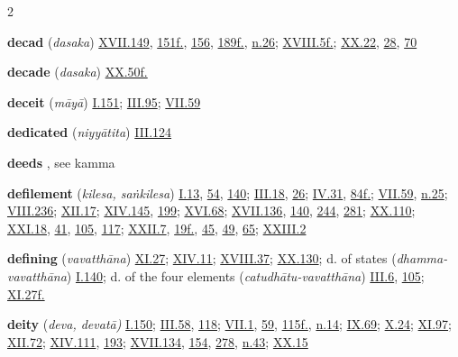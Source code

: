 \begin{multicols}{2}
\begin{vismHanging}
\par\textbf{decad} (\emph{dasaka}) \hyperlink{XVII.149}{XVII.149}{}, \hyperlink{XVII.151}{151f.}{}, \hyperlink{XVII.156}{156}{}, \hyperlink{XVII.189}{189f.}{}, \hyperlink{XVII.n26}{n.26}{}; \hyperlink{XVIII.5}{XVIII.5f.}{}; \hyperlink{XX.22}{XX.22}{}, \hyperlink{XX.28}{28}{}, \hyperlink{XX.70}{70}{}
\par\textbf{decade} (\emph{dasaka}) \hyperlink{XX.50}{XX.50f.}{}
\par\textbf{deceit} (\emph{māyā}) \hyperlink{I.151}{I.151}{}; \hyperlink{III.95}{III.95}{}; \hyperlink{VII.59}{VII.59}{}
\par\textbf{dedicated} (\emph{niyyātita}) \hyperlink{III.124}{III.124}{}
\par\textbf{deeds} , see kamma
\par\textbf{defilement} (\emph{kilesa, saṅkilesa}) \hyperlink{I.13}{I.13}{}, \hyperlink{I.54}{54}{}, \hyperlink{I.140}{140}{}; \hyperlink{III.18}{III.18}{}, \hyperlink{III.26}{26}{}; \hyperlink{IV.31}{IV.31}{}, \hyperlink{IV.84}{84f.}{}; \hyperlink{VII.59}{VII.59}{}, \hyperlink{VII.n25}{n.25}{}; \hyperlink{VIII.236}{VIII.236}{}; \hyperlink{XII.17}{XII.17}{}; \hyperlink{XIV.145}{XIV.145}{}, \hyperlink{XIV.199}{199}{}; \hyperlink{XVI.68}{XVI.68}{}; \hyperlink{XVII.136}{XVII.136}{}, \hyperlink{XVII.140}{140}{}, \hyperlink{XVII.244}{244}{}, \hyperlink{XVII.281}{281}{}; \hyperlink{XX.110}{XX.110}{}; \hyperlink{XXI.18}{XXI.18}{}, \hyperlink{XXI.41}{41}{}, \hyperlink{XXI.105}{105}{}, \hyperlink{XXI.117}{117}{}; \hyperlink{XXII.7}{XXII.7}{}, \hyperlink{XXII.19}{19f.}{}, \hyperlink{XXII.45}{45}{}, \hyperlink{XXII.49}{49}{}, \hyperlink{XXII.65}{65}{}; \hyperlink{XXIII.2}{XXIII.2}{}
\par\textbf{defining} (\emph{vavatthāna}) \hyperlink{XI.27}{XI.27}{}; \hyperlink{XIV.11}{XIV.11}{}; \hyperlink{XVIII.37}{XVIII.37}{}; \hyperlink{XX.130}{XX.130}{}; d. of states (\emph{dhamma-vavatthāna}) \hyperlink{I.140}{I.140}{}; d. of the four elements (\emph{catudhātu-vavatthāna}) \hyperlink{III.6}{III.6}{}, \hyperlink{III.105}{105}{}; \hyperlink{XI.27}{XI.27f.}{}
\par\textbf{deity} (\emph{deva, devatā) }\hyperlink{I.150}{I.150}{}; \hyperlink{III.58}{III.58}{}, \hyperlink{III.118}{118}{}; \hyperlink{VII.1}{VII.1}{}, \hyperlink{VII.59}{59}{}, \hyperlink{VII.115}{115f.}{}, \hyperlink{VII.n14}{n.14}{}; \hyperlink{IX.69}{IX.69}{}; \hyperlink{X.24}{X.24}{}; \hyperlink{XI.97}{XI.97}{}; \hyperlink{XII.72}{XII.72}{}; \hyperlink{XIV.111}{XIV.111}{}, \hyperlink{XIV.193}{193}{}; \hyperlink{XVII.134}{XVII.134}{}, \hyperlink{XVII.154}{154}{}, \hyperlink{XVII.278}{278}{}, \hyperlink{XVII.n43}{n.43}{}; \hyperlink{XX.15}{XX.15}{}

\end{vismHanging}
\end{multicols}
